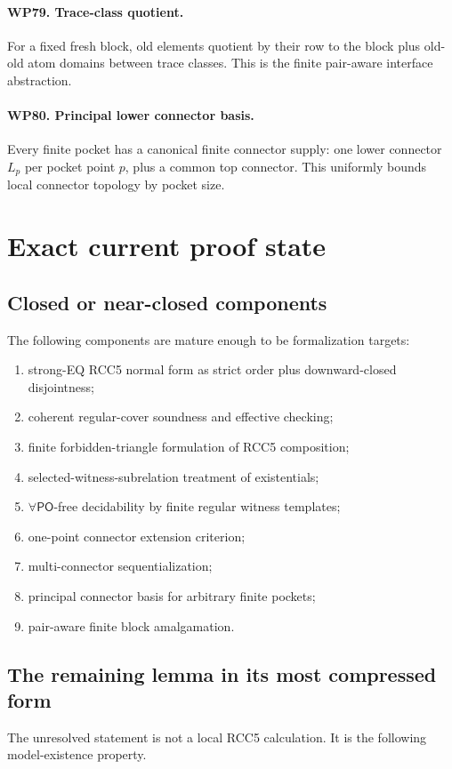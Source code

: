 \documentclass[11pt]{article}
\newcommand{\PO}{\mathsf{PO}}
\begin{document}
\paragraph{WP79. Trace-class quotient.}
For a fixed fresh block, old elements quotient by their row to the block plus old-old atom domains between trace classes.  This is the finite pair-aware interface abstraction.

\paragraph{WP80. Principal lower connector basis.}
Every finite pocket has a canonical finite connector supply: one lower connector $L_p$ per pocket point $p$, plus a common top connector.  This uniformly bounds local connector topology by pocket size.

\section{Exact current proof state}

\subsection{Closed or near-closed components}
The following components are mature enough to be formalization targets:
\begin{enumerate}
\item strong-EQ RCC5 normal form as strict order plus downward-closed disjointness;
\item coherent regular-cover soundness and effective checking;
\item finite forbidden-triangle formulation of RCC5 composition;
\item selected-witness-subrelation treatment of existentials;
\item $\forall\PO$-free decidability by finite regular witness templates;
\item one-point connector extension criterion;
\item multi-connector sequentialization;
\item principal connector basis for arbitrary finite pockets;
\item pair-aware finite block amalgamation.
\end{enumerate}

\subsection{The remaining lemma in its most compressed form}
The unresolved statement is not a local RCC5 calculation.  It is the following model-existence property.
\end{document}
